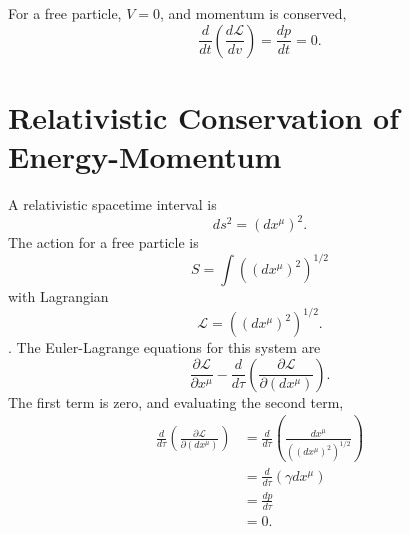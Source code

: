 For a free particle, $V=0$, and momentum is conserved,
\[
\frac{d}{dt}\left(\frac{d\mathcal{L}}{dv}\right) = \frac{dp}{dt} = 0.
\]

\section{Relativistic Conservation of Energy-Momentum}
A relativistic spacetime interval is
\[
ds^2 = \left(dx^\mu\right)^2.
\]
The action for a free particle is
\[
S = \int \left(\left(dx^\mu\right)^2\right)^{1/2}
\]
with Lagrangian
\[
\mathcal{L} = \left(\left(dx^\mu\right)^2\right)^{1/2}.
\].
The Euler-Lagrange equations for this system are
\[
\frac{\partial\mathcal{L}}{\partial x^\mu} - \frac{d}{d\tau}\left( \frac{\partial\mathcal{L}}{\partial \left(dx^\mu\right)}\right).
\]
The first term is zero, and evaluating the second term,
\begin{align*}
\frac{d}{d\tau}\left( \frac{\partial\mathcal{L}}{\partial \left(dx^\mu\right)}\right) &= \frac{d}{d\tau} \left(\frac{dx^\mu}{\left(\left(dx^\mu\right)^2\right)^{1/2}}\right)\\ 
&= \frac{d}{d\tau}\left(\gamma dx^\mu\right) \\
&= \frac{dp}{d\tau} \\
&= 0.
\end{align*}
